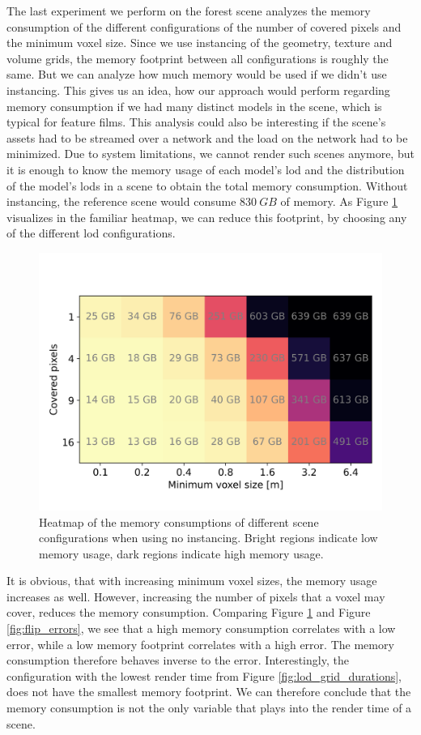 The last experiment we perform on the forest scene analyzes the memory consumption of the different configurations of the number of covered pixels and the minimum voxel size.
Since we use instancing of the geometry, texture and volume grids, the memory footprint between all configurations is roughly the same.
But we can analyze how much memory would be used if we didn't use instancing.
This gives us an idea, how our approach would perform regarding memory consumption if we had many distinct models in the scene, which is typical for feature films.
This analysis could also be interesting if the scene's assets had to be streamed over a network and the load on the network had to be minimized.
Due to system limitations, we cannot render such scenes anymore, but it is enough to know the memory usage of each model's \ac{lod} and the distribution of the model's \acsp{lod} in a scene to obtain the total memory consumption.
Without instancing, the reference scene would consume $\SI{830}{GB}$ of memory.
As Figure \ref{fig:memory_usage} visualizes in the familiar heatmap, we can reduce this footprint, by choosing any of the different \ac{lod} configurations.
\begin{figure}[t]
    \centering
    \includegraphics[width=0.49\linewidth]{img/results/memory_usage.png}
    \caption[Visualization of the memory consumption of different scene configurations]{Heatmap of the memory consumptions of different scene configurations when using no instancing. Bright regions indicate low memory usage, dark regions indicate high memory usage.}
    \label{fig:memory_usage}
\end{figure}
It is obvious, that with increasing minimum voxel sizes, the memory usage increases as well.
However, increasing the number of pixels that a voxel may cover, reduces the memory consumption.
Comparing Figure \ref{fig:memory_usage} and Figure \ref{fig:flip_errors}, we see that a high memory consumption correlates with a low \FLIP error, while a low memory footprint correlates with a high \FLIP error.
The memory consumption therefore behaves inverse to the \FLIP error.
Interestingly, the configuration with the lowest render time from Figure \ref{fig:lod_grid_durations}, does not have the smallest memory footprint.
We can therefore conclude that the memory consumption is not the only variable that plays into the render time of a scene.

